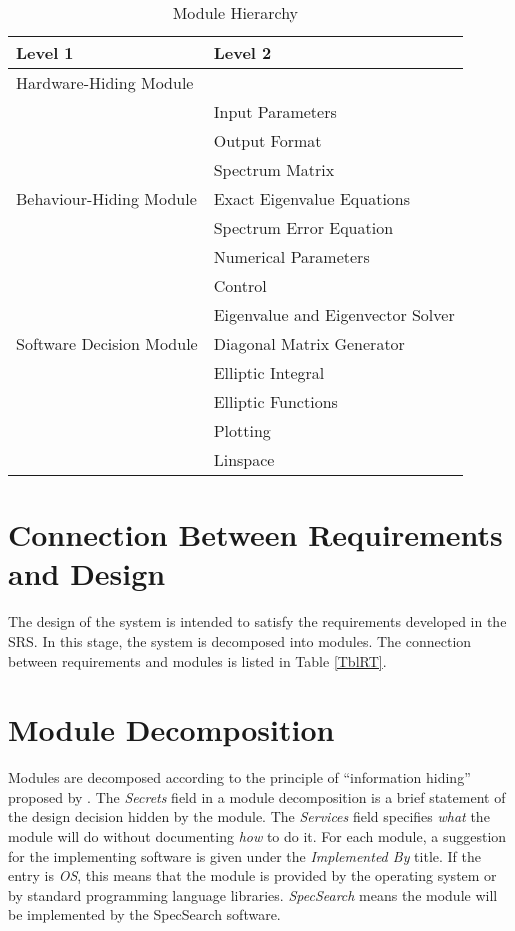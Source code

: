 \documentclass[12pt, titlepage]{article}
\newcommand{\progname}{SpecSearch}
\begin{document}
\begin{table}[h]
\centering
\begin{tabular}{p{} p{}}
\toprule
\textbf{Level 1} & \textbf{Level 2}\\
\midrule

{Hardware-Hiding Module} & ~ \\
\midrule

\multirow{7}{0.3\textwidth}{Behaviour-Hiding Module} 
& Input Parameters \\
& Output Format \\
& Spectrum Matrix \\
& Exact Eigenvalue Equations \\
& Spectrum Error Equation \\
& Numerical Parameters \\  
& Control \\ 
\midrule

\multirow{3}{0.3\textwidth}{Software Decision Module} 
& Eigenvalue and Eigenvector Solver \\
& Diagonal Matrix Generator\\
& Elliptic Integral\\ 
& Elliptic Functions\\ 
& Plotting \\ 
& Linspace \\
\bottomrule

\end{tabular}
\caption{Module Hierarchy}
\label{TblMH}
\end{table}

\newpage 
\section{Connection Between Requirements and Design} \label{SecConnection}

The design of the system is intended to satisfy the requirements developed in
the SRS. In this stage, the system is decomposed into modules. The connection
between requirements and modules is listed in Table \ref{TblRT}.

\section{Module Decomposition} \label{SecMD}


Modules are decomposed according to the principle of ``information hiding''
proposed by \citet{ParnasEtAl1984}. The \emph{Secrets} field in a module
decomposition is a brief statement of the design decision hidden by the
module. The \emph{Services} field specifies \emph{what} the module will do
without documenting \emph{how} to do it. For each module, a suggestion for the
implementing software is given under the \emph{Implemented By} title. If the
entry is \emph{OS}, this means that the module is provided by the operating
system or by standard programming language libraries.  \emph{\progname{}} means 
the
module will be implemented by the \progname{} software.
\end{document}
